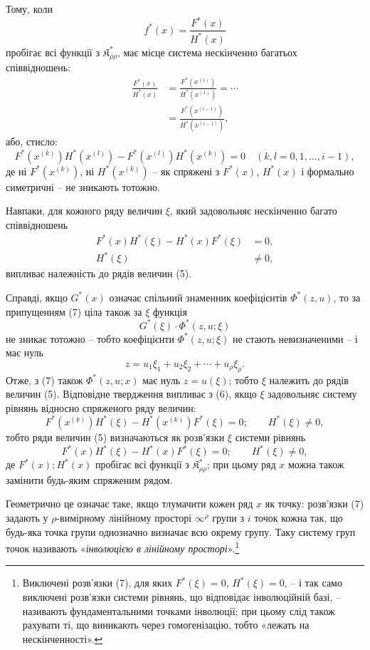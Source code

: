\documentclass[11pt]{article}
\providecommand{\Kfield}{\mathfrak{K}}
\begin{document}
Тому, коли
\[
  f^*(x)=\frac{F^*(x)}{H^*(x)}
\]
пробігає всі функції з $\Kfield^*_{\rho\rho}$, має місце система нескінченно багатьох співвідношень:
\begin{equation}
\begin{aligned}
  \frac{F^*(x)}{H^*(x)}
  &=\frac{F^*(x^{(1)})}{H^*(x^{(1)})}=\cdots\\
  &=\frac{F^*(x^{(i-1)})}{H^*(x^{(i-1)})},
\end{aligned}
\tag{6}
\end{equation}
або, стисло:
\[
  F^*(x^{(k)})H^*(x^{(l)})-
  F^*(x^{(l)})H^*(x^{(k)})=0
  \quad(k,l=0,1,\ldots,i-1),
\]
де ні $F^*(x^{(k)})$, ні $H^*(x^{(k)})$ -- як спряжені з $F^*(x)$, $H^*(x)$ і формально симетричні -- не зникають тотожно.

Навпаки, для кожного ряду величин $\xi$, який задовольняє нескінченно багато співвідношень
\begin{equation}
\begin{aligned}
  F^*(x)H^*(\xi)-H^*(x)F^*(\xi)&=0,\\
  H^*(\xi)&\ne0,
\end{aligned}
\tag{7}
\end{equation}
випливає належність до рядів величин (5).

Справді, якщо $G^*(x)$ означає спільний знаменник коефіцієнтів $\Phi^*(z,u)$, то за припущенням (7) ціла також за $\xi$ функція
\[
  G^*(\xi)\cdot\Phi^*(z,u;\xi)
\]
не зникає тотожно -- тобто коефіцієнти $\Phi^*(z,u;\xi)$ не стають невизначеними -- і має нуль
\[
  z=u_1\xi_1+u_2\xi_2+\cdots+u_\rho\xi_\rho.
\]
Отже, з (7) також $\Phi^*(z,u;x)$ має нуль $z=u(\xi)$; тобто $\xi$ належить до рядів величин (5). Відповідне твердження випливає з (6), якщо $\xi$ задовольняє систему рівнянь відносно спряженого ряду величин:
\[
  F^*(x^{(k)})H^*(\xi)-H^*(x^{(k)})F^*(\xi)=0;
  \qquad H^*(\xi)\ne0,
\]
тобто ряди величин (5) визначаються як розв'язки $\xi$ системи рівнянь
\[
  F^*(x)H^*(\xi)-H^*(x)F^*(\xi)=0;
  \qquad H^*(\xi)\ne0,
\]
де $F^*(x):H^*(x)$ пробігає всі функції з $\Kfield^*_{\rho\rho}$; при цьому ряд $x$ можна також замінити будь-яким спряженим рядом.

Геометрично це означає таке, якщо тлумачити кожен ряд $x$ як точку: розв'язки (7) задають у $\rho$-вимірному лінійному просторі $\infty^\rho$ групи з $i$ точок кожна так, що будь-яка точка групи однозначно визначає всю окрему групу. Таку систему груп точок називають «\emph{інволюцією в лінійному просторі}».\footnote{Виключені розв'язки (7), для яких $F^*(\xi)=0$, $H^*(\xi)=0$, -- і так само виключені розв'язки системи рівнянь, що відповідає інволюційній базі, -- називають фундаментальними точками інволюції; при цьому слід також рахувати ті, що виникають через гомогенізацію, тобто «лежать на нескінченності».}
\end{document}
